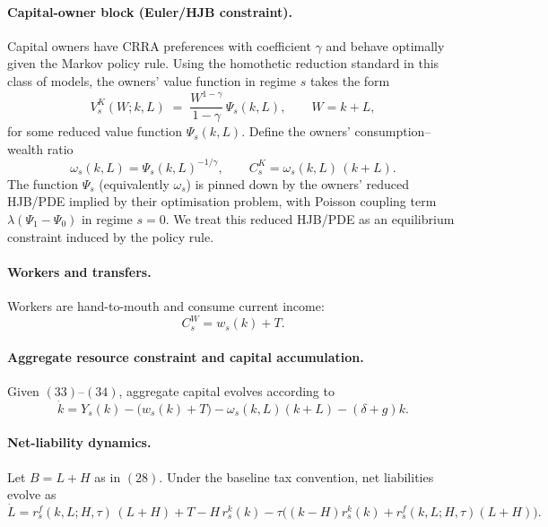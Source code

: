 \documentclass{article}
\begin{document}
\paragraph{Capital-owner block (Euler/HJB constraint).}
Capital owners have CRRA preferences with coefficient $\gamma$ and behave optimally given the Markov policy rule. Using the homothetic reduction standard in this class of models, the owners' value function in regime $s$ takes the form
\begin{equation}
V^K_s(W;k,L) \;=\; \frac{W^{1-\gamma}}{1-\gamma}\,\Psi_s(k,L),
\qquad W=k+L,
\tag{32}
\end{equation}
for some reduced value function $\Psi_s(k,L)$. Define the owners' consumption--wealth ratio
\begin{equation}
\omega_s(k,L)=\Psi_s(k,L)^{-1/\gamma},
\qquad
C^K_s=\omega_s(k,L)\,(k+L).
\tag{33}
\end{equation}
The function $\Psi_s$ (equivalently $\omega_s$) is pinned down by the owners' reduced HJB/PDE implied by their optimisation problem, with Poisson coupling term $\lambda(\Psi_1-\Psi_0)$ in regime $s=0$. We treat this reduced HJB/PDE as an equilibrium constraint induced by the policy rule.

\paragraph{Workers and transfers.}
Workers are hand-to-mouth and consume current income:
\begin{equation}
C^W_s = w_s(k)+T.
\tag{34}
\end{equation}

\paragraph{Aggregate resource constraint and capital accumulation.}
Given \((33)\)--\((34)\), aggregate capital evolves according to
\begin{equation}
\dot{k}
=
Y_s(k)
-\big(w_s(k)+T\big)
-\omega_s(k,L)(k+L)
-(\delta+g)k.
\tag{35}
\end{equation}

\paragraph{Net-liability dynamics.}
Let $B=L+H$ as in \((28)\). Under the baseline tax convention, net liabilities evolve as
\begin{equation}
\dot{L}
=
r^f_s(k,L;H,\tau)\,(L+H)
+T
-H\,r^k_s(k)
-\tau\Big( (k-H)r^k_s(k)+r^f_s(k,L;H,\tau)(L+H)\Big).
\tag{36}
\end{equation}
\end{document}
